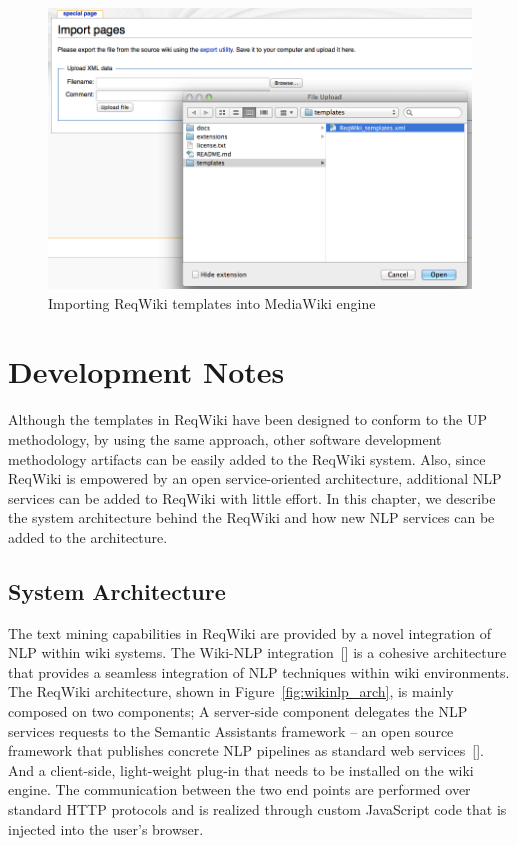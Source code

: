 \documentclass[10pt,twoside,openany,bibtotoc,liststotoc]{scrbook}
\newcommand{\sa}{Semantic Assistants\xspace}
\begin{document}
\begin{figure}[h!]
\centering
\includegraphics[width=\textwidth]{reqwiki_template_import.png}
\caption{Importing ReqWiki templates into MediaWiki engine}
\label{fig:wiki_template_import}
\end{figure}


\chapter{Development Notes}
\label{chap:develop}
Although the templates in ReqWiki have been designed to conform to the UP methodology, by using the same approach, other software development methodology artifacts can be easily added to the ReqWiki system. Also, since ReqWiki is empowered by an open service-oriented architecture, additional NLP services can be added to ReqWiki with little effort. In this chapter, we describe the system architecture behind the ReqWiki and how new NLP services can be added to the architecture.

\section{System Architecture}
The text mining capabilities in ReqWiki are provided by a novel integration of NLP within wiki systems. The Wiki-NLP integration~[\cite{wikinlp2012}] is a cohesive architecture that provides a seamless integration of NLP techniques within wiki environments. The ReqWiki architecture, shown in Figure~\ref{fig:wikinlp_arch}, is mainly composed on two components; A server-side component delegates the NLP services requests to the \sa framework -- an open source framework that publishes concrete NLP pipelines as standard web services~[\cite{aswc08}]. And a client-side, light-weight plug-in that needs to be installed on the wiki engine. The communication between the two end points are performed over standard HTTP protocols and is realized through custom JavaScript code that is injected into the user's browser.
\end{document}
